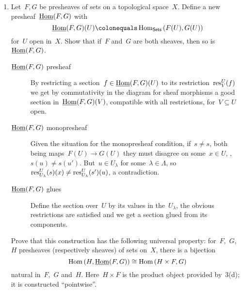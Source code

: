 \documentclass[a4paper,11pt,oneside,openany,article]{memoir}
\begin{document}
\begin{enumerate}
  \item Let~$F,G$ be presheaves of sets on a topological space~$X$. Define a new presheaf~$\underline{\operatorname{Hom}}(F,G)$ with
    \begin{equation}
      \uHom(F,G)(U)\colonequals\Hom_{\Sets}\left( F(U),G(U) \right)
    \end{equation}
    for~$U$ open in~$X$. Show that if~$F$ and~$G$ are both sheaves, then so is~$\underline{\operatorname{Hom}}(F,G)$.

    \begin{solution}
      \begin{description}
        \item[$\underline{\operatorname{Hom}}(F,G)$ presheaf] By restricting a section~$f\in\underline{\operatorname{Hom}}(F,G)(U)$ to its restriction~$\mathrm{res}_V^U(f)$ we get by commutativity in the diagram for sheaf morphisms a good section in~$\underline{\operatorname{Hom}}(F,G)(V)$, compatible with all restrictions, for~$V\subseteq U$ open.
        \item[$\underline{\operatorname{Hom}}(F,G)$ monopresheaf] Given the situation for the monopresheaf condition, if~$s\neq s$, both being maps~$F(U)\to G(U)$ they must disagree on some~$x\in U$, \ie, $s(u)\neq s(u')$. But~$u\in U_\lambda$ for some~$\lambda\in\Lambda$, so~$\mathrm{res}_{U_\lambda}^U(s)(x)\neq\mathrm{res}_{U_\lambda}^U(s')(u)$, a contradiction.
        \item[$\underline{\operatorname{Hom}}(F,G)$ glues] Define the section over~$U$ by its values in the~$U_\lambda$, the obvious restrictions are satisfied and we get a section glued from its components.
      \end{description}
    \end{solution}

    Prove that this construction has the following universal property: for~$F$,~$G$,~$H$ presheaves (respectively sheaves) of sets on~$X$, there is a bijection
    \begin{equation}
      \operatorname{Hom}\left( H,\underline{\operatorname{Hom}}(F,G) \right)\cong\operatorname{Hom}\left( H\times F,G \right)
      \label{equation:natural-bijection}
    \end{equation}
    natural in~$F$,~$G$ and~$H$. Here~$H\times F$ is the product object provided by~3(d); it is constructed ``pointwise''.


\end{enumerate}
\end{document}
